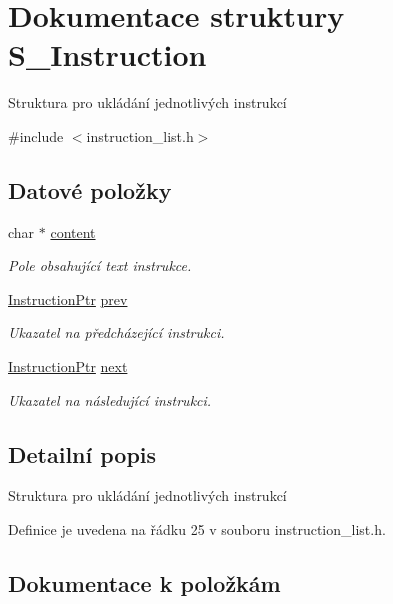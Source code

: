\hypertarget{struct_s___instruction}{}\section{Dokumentace struktury S\+\_\+\+Instruction}
\label{struct_s___instruction}


Struktura pro ukládání jednotlivých instrukcí  




{\ttfamily \#include $<$instruction\+\_\+list.\+h$>$}

\subsection*{Datové položky}
\begin{DoxyCompactItemize}
\item 
char $\ast$ \hyperlink{struct_s___instruction_ab0746fb6288bd31fd0d505fab48d8785}{content}
\begin{DoxyCompactList}\small\item\em Pole obsahující text instrukce. \end{DoxyCompactList}\item 
\hyperlink{instruction__list_8h_aaaf9f8ee3d7203e01ba5c651c5ee8a99}{Instruction\+Ptr} \hyperlink{struct_s___instruction_aa3859e312032bb77d2318dcae6e6300c}{prev}
\begin{DoxyCompactList}\small\item\em Ukazatel na předcházející instrukci. \end{DoxyCompactList}\item 
\hyperlink{instruction__list_8h_aaaf9f8ee3d7203e01ba5c651c5ee8a99}{Instruction\+Ptr} \hyperlink{struct_s___instruction_a108f87dc4c7ba427715df378d065dd65}{next}
\begin{DoxyCompactList}\small\item\em Ukazatel na následující instrukci. \end{DoxyCompactList}\end{DoxyCompactItemize}


\subsection{Detailní popis}
Struktura pro ukládání jednotlivých instrukcí 

Definice je uvedena na řádku 25 v souboru instruction\+\_\+list.\+h.



\subsection{Dokumentace k položkám}
\mbox{\label{struct_s___instruction_ab0746fb6288bd31fd0d505fab48d8785}} 
